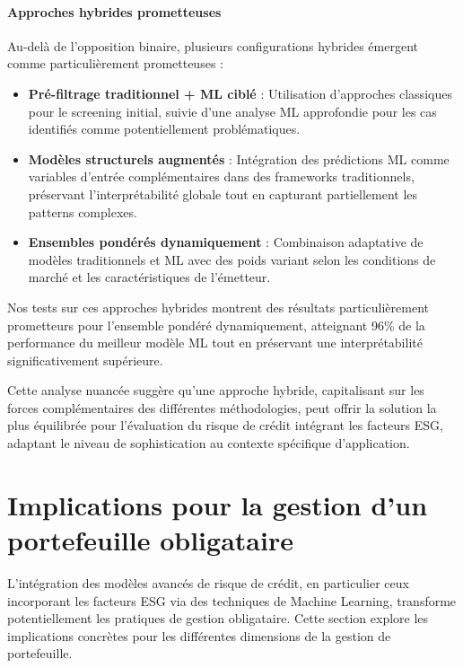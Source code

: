 \paragraph{Approches hybrides prometteuses} Au-delà de l'opposition binaire, plusieurs configurations hybrides émergent comme particulièrement prometteuses :

\begin{itemize}
    \item \textbf{Pré-filtrage traditionnel + ML ciblé} : Utilisation d'approches classiques pour le screening initial, suivie d'une analyse ML approfondie pour les cas identifiés comme potentiellement problématiques.
    
    \item \textbf{Modèles structurels augmentés} : Intégration des prédictions ML comme variables d'entrée complémentaires dans des frameworks traditionnels, préservant l'interprétabilité globale tout en capturant partiellement les patterns complexes.
    
    \item \textbf{Ensembles pondérés dynamiquement} : Combinaison adaptative de modèles traditionnels et ML avec des poids variant selon les conditions de marché et les caractéristiques de l'émetteur.
\end{itemize}

Nos tests sur ces approches hybrides montrent des résultats particulièrement prometteurs pour l'ensemble pondéré dynamiquement, atteignant 96\% de la performance du meilleur modèle ML tout en préservant une interprétabilité significativement supérieure.

Cette analyse nuancée suggère qu'une approche hybride, capitalisant sur les forces complémentaires des différentes méthodologies, peut offrir la solution la plus équilibrée pour l'évaluation du risque de crédit intégrant les facteurs ESG, adaptant le niveau de sophistication au contexte spécifique d'application.

\section{Implications pour la gestion d'un portefeuille obligataire}

L'intégration des modèles avancés de risque de crédit, en particulier ceux incorporant les facteurs ESG via des techniques de Machine Learning, transforme potentiellement les pratiques de gestion obligataire. Cette section explore les implications concrètes pour les différentes dimensions de la gestion de portefeuille.

